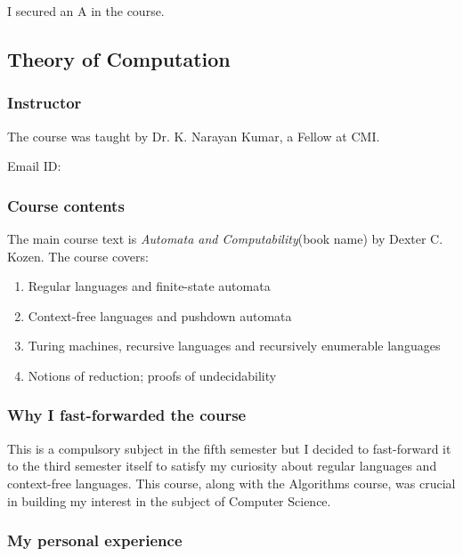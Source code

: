 \documentclass[a4paper]{amsart}
\newcommand{\bookname}[1]{{\em #1}{\small{(book name)}}}
\begin{document}
I secured an A in the course.

\subsection{Theory of Computation}\label{toc}

\subsubsection{Instructor}

The course was taught by Dr. K. Narayan Kumar, a Fellow at CMI.

Email ID: 

\subsubsection{Course contents}

The main course text is \bookname{Automata and Computability} by
Dexter C. Kozen. The course covers:

\begin{enumerate}

\item Regular languages and finite-state automata

\item Context-free languages and pushdown automata

\item Turing machines, recursive languages and recursively enumerable languages

\item Notions of reduction; proofs of undecidability

\end{enumerate}

\subsubsection{Why I fast-forwarded the course}

This is a compulsory subject in the fifth semester but I decided to
fast-forward it to the third semester itself to satisfy my curiosity
about regular languages and context-free languages. This course, along
with the Algorithms course, was crucial in building my interest in the
subject of Computer Science.

\subsubsection{My personal experience}
\end{document}
